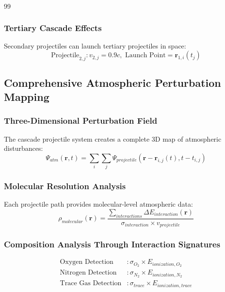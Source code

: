 \documentclass[12pt,a4paper]{article}
\begin{document}
\begin{thebibliography}{99}
\subsubsection{Tertiary Cascade Effects}
Secondary projectiles can launch tertiary projectiles in space:
\begin{equation}
\text{Projectile}_{2,j}: v_{2,j} = 0.9c, \text{ Launch Point} = \mathbf{r}_{1,i}(t_j)
\end{equation}

\subsection{Comprehensive Atmospheric Perturbation Mapping}

\subsubsection{Three-Dimensional Perturbation Field}

The cascade projectile system creates a complete 3D map of atmospheric disturbances:
\begin{equation}
\Psi_{atm}(\mathbf{r},t) = \sum_{i} \sum_{j} \Psi_{projectile}(\mathbf{r} - \mathbf{r}_{i,j}(t), t - t_{i,j})
\end{equation}

\subsubsection{Molecular Resolution Analysis}

Each projectile path provides molecular-level atmospheric data:
\begin{equation}
\rho_{molecular}(\mathbf{r}) = \frac{\sum_{interactions} \Delta E_{interaction}(\mathbf{r})}{\sigma_{interaction} \times v_{projectile}}
\end{equation}

\subsubsection{Composition Analysis Through Interaction Signatures}
\begin{align}
\text{Oxygen Detection} &: \sigma_{O_2} \times E_{ionization,O_2} \\
\text{Nitrogen Detection} &: \sigma_{N_2} \times E_{ionization,N_2} \\
\text{Trace Gas Detection} &: \sigma_{trace} \times E_{ionization,trace}
\end{align}


\end{thebibliography}
\end{document}
